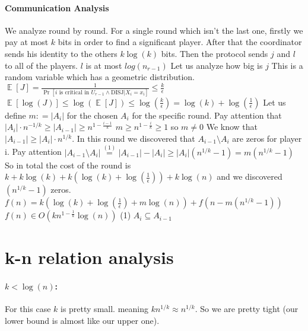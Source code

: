 \documentclass{article}
\theoremstyle{plain}
\begin{document}
\paragraph{Communication Analysis}
We analyze round by round. For a single round which isn't the last one, firstly we pay at most $k$ bits in order to find a significant player. After that the coordinator sends his identity to the others $k\log(k)$ bits. Then the protocol sends $j$ and $l$ to all of the players. $l$ is at most $log(n_{r-1})$
Let us analyze how big is $j$ \newline
This is a random variable which has a geometric distribution. \newline
$ \mathop{\mathbb{E}} [J] = \frac{1}{\Pr[\text{$i$ is critical in $U_{r-1}$} \land \text{DISJ} | X_i = x_i]} \leq \frac{k}{\epsilon}$ \newline
$\mathop{\mathbb{E}} [\log(J)] \leq \log(\mathop{\mathbb{E}} [J]) \leq \log(\frac{k}{\epsilon}) = \log(k) + \log(\frac{1}{\epsilon})$ \newline
Let us define $m : = |A_i|$ for the chosen $A_i$ for the specific round.
Pay attention that $|A_i| \cdot n^{-1/k} \geq |A_{i-1}| \geq n^{1-\frac{i-1}{k}}$ \newline
$m \geq n^{1-\frac{i}{k}} \geq 1$ so $m \neq 0$\newline
We know that $|A_{i-1}| \geq |A_i| \cdot n^{1/k}$. In this round we discovered that $A_{i-1} \setminus A_i$ are zeros for player i. Pay attention $|A_{i-1} \setminus A_i| \overset{(1)}{=} |A_{i-1}| - |A_i| \geq |A_i|(n^{1/k} - 1) = m(n^{1/k} - 1)$ \newline
So in total the cost of the round is $k + k\log(k) + k(\log(k) + \log(\frac{1}{\epsilon})) + k\log(n)$ and we discovered $(n^{1/k} - 1)$ zeros. \newline
$f(n) = k(\log(k) + \log(\frac{1}{\epsilon}) + m\log(n)) + f(n - m(n^{1/k} - 1))$ \newline 
$f(n) \in O(kn^{1-\frac{1}{k}}\log(n))$ \newline
(1) $A_i \subseteq A_{i-1}$
\section{k-n relation analysis}
\paragraph{$k < \log(n)$:}
For this case $k$ is pretty small. meaning $kn^{1/k} \approx n^{1/k}$. So we are pretty tight (our lower bound is almost like our upper one).
\end{document}
